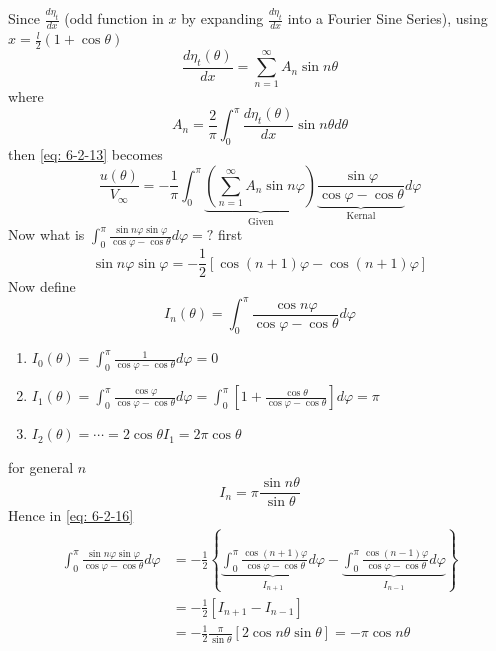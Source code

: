 \begin{itemize}
Since $\displaystyle\frac{d\eta_t}{dx}$ (odd function in $x$ by expanding $\displaystyle\frac{d\eta_t}{dx}$ into a Fourier Sine Series), using $\displaystyle x=\frac{l}{2}\left(1+\cos\theta\right)$
\begin{equation}
\frac{d\eta_t(\theta)}{dx} = \sum_{n=1}^\infty A_n\sin n\theta\label{eq: 6-2-14}
\end{equation}
where
\begin{equation}
A_n = \frac{2}{\pi}\int_0^\pi\frac{d\eta_t(\theta)}{dx}\sin n\theta d\theta \label{eq: 6-2-15}
\end{equation}
then \eqref{eq: 6-2-13} becomes
\begin{equation}
\frac{u(\theta)}{V_\infty} = -\frac{1}{\pi}\int_0^\pi\underbrace{\left(\sum_{n=1}^\infty A_n\sin n\varphi\right)}_{\text{Given}}\underbrace{\frac{\sin\varphi}{\cos\varphi - \cos\theta}}_{\text{Kernal}}d\varphi
\label{eq: 6-2-16}
\end{equation}
Now what is $\displaystyle\int_0^\pi\frac{\sin n\varphi \sin\varphi}{\cos\varphi-\cos\theta}d\varphi=?$
first
\[
\sin n\varphi \sin\varphi = -\frac{1}{2}\left[\cos(n+1)\varphi - \cos(n+1)\varphi\right]
\]
Now define
\[
I_n(\theta) = \int_0^\pi\frac{\cos n\varphi}{\cos\varphi - \cos\theta}d\varphi
\]
\begin{enumerate}[label = \protect\circled{\arabic*}]
\item $\displaystyle I_0(\theta) = \int_0^\pi\frac{1}{\cos\varphi - \cos\theta}d\varphi = 0$
\item $\displaystyle I_1(\theta) = \int_0^\pi\frac{\cos\varphi}{\cos\varphi - \cos\theta}d\varphi = \int_0^\pi\left[1+\frac{\cos\theta}{\cos\varphi-\cos\theta}\right]d\varphi = \pi$
\item $I_2(\theta) = \cdots = 2\cos\theta I_1 = 2\pi\cos\theta$
\end{enumerate}
for general $n$
\begin{equation}
I_n = \pi\frac{\sin n\theta}{\sin\theta}
\label{eq: 6-2-19}
\end{equation}
Hence in \eqref{eq: 6-2-16}
\begin{align*}
\int_0^\pi\frac{\sin n\varphi \sin\varphi}{\cos\varphi-\cos\theta}d\varphi
&= -\frac{1}{2}\left\{\underbrace{\int_0^\pi\frac{\cos(n+1)\varphi}{\cos\varphi-\cos\theta}d\varphi}_{I_{n+1}} - \underbrace{\int_0^\pi\frac{\cos(n-1)\varphi}{\cos\varphi-\cos\theta}d\varphi}_{I_{n-1}}\right\} \\
&= -\frac{1}{2}\left[I_{n+1}-I_{n-1}\right] \\
&= -\frac{1}{2}\frac{\pi}{\sin\theta}\left[2\cos n\theta\sin\theta\right] = -\pi\cos n\theta

\end{align*}
\end{itemize}
